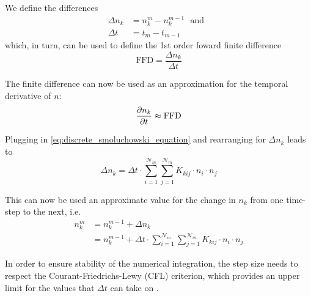         We define the differences
        \begin{align}
            \Delta n_k
                &=n_k^m-n_k^{m-1}
            \ \ \ \text{and}\ \ \
            \\
            \Delta t
                &=t_m-t_{m-1}
        \end{align}
        which, in turn, can be used to define the 1st order foward finite difference
        \begin{equation}
            \text{FFD}
                =\frac{\Delta n_k}{\Delta t}
        \end{equation}
        
        The finite difference can now be used as an approximation for the temporal derivative 
        of $n$:
        \begin{equation}
            \frac{\partial n_k}{\partial t}
                \approx\text{FFD}
        \end{equation}
        
        Plugging in \cref{eq:discrete_smoluchowski_equation} and rearranging for $\Delta n_k$ 
        leads to
        \begin{equation}
            \Delta n_k
            =\Delta t\cdot
                \sum_{i=1}^{\mathcal N_m}\sum_{j=1}^{\mathcal N_m}
                K_{kij}\cdot n_i\cdot n_j
        \end{equation}
        
        This can now be used an approximate value for the change in $n_k$ from one time-step to 
        the next, i.e.
        \begin{equation}
            \begin{split}
                n_k^m
                    &=n_k^{m-1}+\Delta n_k
                \\
                    &=n_k^{m-1}+\Delta t\cdot
                        \sum_{i=1}^{\mathcal N_m}\sum_{j=1}^{\mathcal N_m}
                        K_{kij}\cdot n_i\cdot n_j
            \end{split}
        \end{equation}
        
        In order to ensure stability of the numerical integration, the step size needs to respect the 
        Courant-Friedrichs-Lewy (CFL) criterion, which provides an upper limit for the values that 
        $\Delta t$ can take on \cite{courant_friedrichs_lewy_1928}.\\
        
